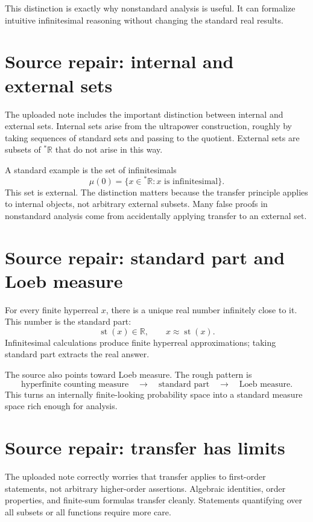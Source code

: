 This distinction is exactly why nonstandard analysis is useful.  It can formalize intuitive infinitesimal reasoning without changing the standard real results.


\section{Source repair: internal and external sets}

The uploaded note includes the important distinction between internal and external sets.  Internal sets arise from the ultrapower construction, roughly by taking sequences of standard sets and passing to the quotient.  External sets are subsets of \({}^*\mathbb R\) that do not arise in this way.

A standard example is the set of infinitesimals
\[
  \mu(0)=\{x\in{}^*\mathbb R:x\text{ is infinitesimal}\}.
\]
This set is external.  The distinction matters because the transfer principle applies to internal objects, not arbitrary external subsets.  Many false proofs in nonstandard analysis come from accidentally applying transfer to an external set.

\section{Source repair: standard part and Loeb measure}

For every finite hyperreal \(x\), there is a unique real number infinitely close to it.  This number is the standard part:
\[
  \operatorname{st}(x)\in\mathbb R,\qquad x\approx \operatorname{st}(x).
\]
Infinitesimal calculations produce finite hyperreal approximations; taking standard part extracts the real answer.

The source also points toward Loeb measure.  The rough pattern is
\[
  \text{hyperfinite counting measure}
  \quad\longrightarrow\quad
  \text{standard part}
  \quad\longrightarrow\quad
  \text{Loeb measure}.
\]
This turns an internally finite-looking probability space into a standard measure space rich enough for analysis.

\section{Source repair: transfer has limits}

The uploaded note correctly worries that transfer applies to first-order statements, not arbitrary higher-order assertions.  Algebraic identities, order properties, and finite-sum formulas transfer cleanly.  Statements quantifying over all subsets or all functions require more care.

